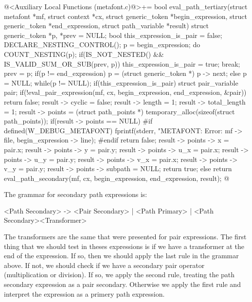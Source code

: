 \iniciocodigo
@<Auxiliary Local Functions (metafont.c)@>+=
bool eval_path_tertiary(struct metafont *mf, struct context *cx,
                        struct generic_token *begin_expression,
                        struct generic_token *end_expression,
                        struct path_variable *result){
  struct generic_token *p, *prev = NULL;
  bool this_expression_is_pair = false;
  DECLARE_NESTING_CONTROL();
  p = begin_expression;
  do{
    COUNT_NESTING(p);
    if(IS_NOT_NESTED() && IS_VALID_SUM_OR_SUB(prev, p)){
      this_expression_is_pair = true;
      break;
    }
    prev = p;
    if(p != end_expression)
      p = (struct generic_token *) p -> next;
    else
      p = NULL;
  }while(p != NULL);
  if(this_expression_is_pair){
    struct pair_variable pair;
    if(!eval_pair_expression(mf, cx, begin_expression, end_expression,
                            &pair))
      return false;
    result -> cyclic = false;
    result -> length = 1;
    result -> total_length = 1;
    result -> points = (struct path_points *)
                         temporary_alloc(sizeof(struct path_points));
    if(result -> points == NULL){
#if defined(W_DEBUG_METAFONT)
      fprintf(stderr, "METAFONT: Error: %
              mf -> file, begin_expression -> line);
#endif
      return false;
    }
    result -> points -> x = pair.x;
    result -> points -> y = pair.y;
    result -> points -> u_x = pair.x;
    result -> points -> u_y = pair.y;
    result -> points -> v_x = pair.x;
    result -> points -> v_y = pair.y;
    result -> points -> subpath = NULL;
    return true;
  }
  else
    return eval_path_secondary(mf, cx, begin_expression, end_expression,
                               result);
}
@
\fimcodigo


The grammar for secondary path expressions is:

\alinhaverbatim
<Path Secondary> -> <Pair Secondary> | <Path Primary> |
                    <Path Secondary><Transformer>
\alinhanormal

The transformers are the same that were presented for pair
expressions. The first thing that we should test in theses expressions
is if we have a transformer at the end of the expression. If so, then
we should apply the last rule in the grammar above. If not, we should
check if we have a secondary pair operator (multiplication or
division). If so, we apply the second rule, treating the path
secondary expression as a pair secondary. Otherwise we apply the first
rule and interpret the expression as a primery path expression.

